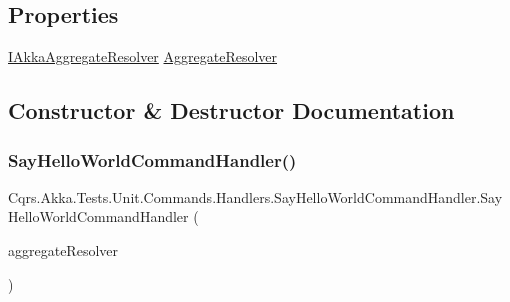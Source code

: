 \subsection*{Properties}
\begin{DoxyCompactItemize}
\item 
\hyperlink{interfaceCqrs_1_1Akka_1_1Domain_1_1IAkkaAggregateResolver}{I\+Akka\+Aggregate\+Resolver} \hyperlink{classCqrs_1_1Akka_1_1Tests_1_1Unit_1_1Commands_1_1Handlers_1_1SayHelloWorldCommandHandler_a4222ccc27f8a550857281bdd97e59b7c_a4222ccc27f8a550857281bdd97e59b7c}{Aggregate\+Resolver}
\end{DoxyCompactItemize}


\subsection{Constructor \& Destructor Documentation}
\mbox{\label{classCqrs_1_1Akka_1_1Tests_1_1Unit_1_1Commands_1_1Handlers_1_1SayHelloWorldCommandHandler_a421fd9e6d3c9cbb5e93453675af63de0_a421fd9e6d3c9cbb5e93453675af63de0}} 
\subsubsection{\texorpdfstring{Say\+Hello\+World\+Command\+Handler()}{SayHelloWorldCommandHandler()}}
{\footnotesize\ttfamily Cqrs.\+Akka.\+Tests.\+Unit.\+Commands.\+Handlers.\+Say\+Hello\+World\+Command\+Handler.\+Say\+Hello\+World\+Command\+Handler (\begin{DoxyParamCaption}\item[{\hyperlink{interfaceCqrs_1_1Akka_1_1Domain_1_1IAkkaAggregateResolver}{I\+Akka\+Aggregate\+Resolver}}]{aggregate\+Resolver }\end{DoxyParamCaption})}



